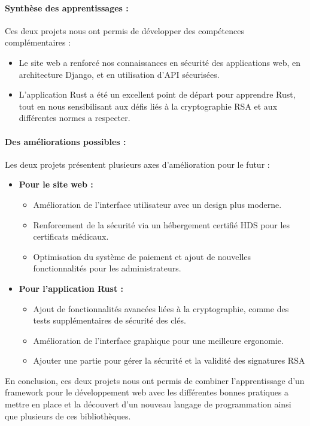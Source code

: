 \documentclass[12pt]{article} %
\begin{document}
\paragraph{Synthèse des apprentissages :}  
Ces deux projets nous ont permis de développer des compétences complémentaires :  
\begin{itemize}
    \item Le site web a renforcé nos connaissances en sécurité des applications web, en architecture Django, et en utilisation d'API sécurisées.
    \item L'application Rust a été un excellent point de départ pour apprendre Rust, tout en nous sensibilisant aux défis liés à la cryptographie RSA et aux différentes normes a respecter.
\end{itemize}

\paragraph{Des améliorations possibles :}  
Les deux projets présentent plusieurs axes d'amélioration pour le futur :  
\begin{itemize}
    \item \textbf{Pour le site web :}
    \begin{itemize}
        \item Amélioration de l'interface utilisateur avec un design plus moderne.
        \item Renforcement de la sécurité via un hébergement certifié HDS pour les certificats médicaux.
        \item Optimisation du système de paiement et ajout de nouvelles fonctionnalités pour les administrateurs.
    \end{itemize}

    \item \textbf{Pour l'application Rust :}
    \begin{itemize}
        \item Ajout de fonctionnalités avancées liées à la cryptographie, comme des tests supplémentaires de sécurité des clés.
        \item Amélioration de l'interface graphique pour une meilleure ergonomie.
        \item Ajouter une partie pour gérer la sécurité et la validité des signatures RSA
    \end{itemize}
\end{itemize}

En conclusion, ces deux projets nous ont permis de combiner l'apprentissage d'un framework pour le développement web avec les différentes bonnes pratiques a mettre en place et la découvert d'un nouveau langage de programmation ainsi que plusieurs de ces bibliothèques.
\end{document}
